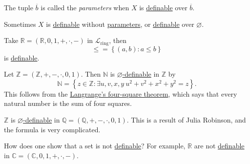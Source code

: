 \begin{notation}[Parameter]\label{not:parameter}
	The tuple \(\overline{b} \) is called the \emph{parameters} when \(X\) is \hyperref[def:definable-set]{definable} over \(\overline{b} \).
\end{notation}

\begin{remark}
	Sometimes \(X\) is \hyperref[def:definable-set]{definable} without \hyperref[not:parameter]{parameters}, or \hyperref[def:definable-set]{definable} over \(\varnothing \).
\end{remark}

\begin{eg}
	Take \(\mathbb{R} =(\mathbb{R} , 0, 1, +, \cdot, -)\) in \(\mathcal{L} _{\text{ring} }\), then
	\[
		\leq = \left\{ (a, b) \colon a \leq b\right\}
	\]
	is \hyperref[def:definable-set]{definable}.
\end{eg}

\begin{eg}
	Let \(\mathbb{Z} =(\mathbb{Z} , +, -, \cdot, 0, 1)\). Then \(\mathbb{N} \) is \hyperref[def:definable-set]{\(\varnothing \)-definable} in \(\mathbb{Z} \) by
	\[
		\mathbb{N} = \left\{ z\in \mathbb{Z} \colon \exists u, v, x, y\ u^2 + v^2 + x^2 + y^2 = z \right\}.
	\]
	This follows from the \href{https://en.wikipedia.org/wiki/Lagrange%27s_four-square_theorem}{Langrange's four-square theorem}, which says that every natural number is the sum of four squares.
\end{eg}

\begin{eg}
	\(\mathbb{Z} \) is \hyperref[def:definable-set]{\(\varnothing \)-definable} in \(\mathbb{Q} = (\mathbb{Q} , +, -, \cdot, 0, 1)\). This is a result of Julia Robinson, and the formula is very complicated.
\end{eg}

\begin{problem*}
	How does one show that a set is not \hyperref[def:definable-set]{definable}? For example, \(\mathbb{R} \) are not \hyperref[def:definable-set]{definable} in \(\mathbb{C} = (\mathbb{C} , 0, 1, +, \cdot, -)\).
\end{problem*}